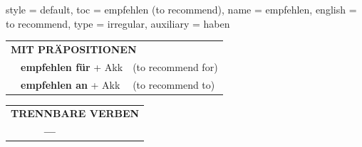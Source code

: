\begin{verbentry}{
  style = {default},
  toc = {empfehlen (to recommend)},
  name = {empfehlen},
  english = {to recommend},
  type = {irregular},
  auxiliary = {haben}
}
\vspace{10pt}

\begin{tabular}{lll}
\multicolumn{3}{l}{\textbf{MIT PRÄPOSITIONEN}}\\
& \textbf{empfehlen für} + Akk & (to recommend for)\\
& \textbf{empfehlen an} + Akk & (to recommend to)\\
\end{tabular}
\hfill
\begin{tabular}{lll}
\multicolumn{3}{l}{\textbf{TRENNBARE VERBEN}}\\
& \textbf{---} & \\
\end{tabular}
\vspace{-5pt}
\end{verbentry}

